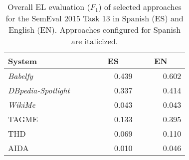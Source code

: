 \documentclass[sigconf]{acmart}
\begin{document}
\begin{table}[tb!]
\centering
\caption{Overall EL evaluation ($F_1$) of selected approaches for the SemEval 2015 Task 13 in Spanish (ES) and English (EN). Approaches configured for Spanish are italicized.}
\label{tab:evaluateEL}
\begin{tabular}{lrr}
\toprule
\textbf{System} &~~~\textbf{ES}~~~&~~~\textbf{EN}~~~ \\ \midrule
\textit{Babelfy}          &0.439&0.602\\
\textit{DBpedia-Spotlight}~~~~&0.337&0.414\\
\textit{WikiMe}           &0.043&0.043\\ \midrule
TAGME                     &0.133&0.395\\
THD                       &0.069&0.110\\
AIDA                      &0.010&0.046\\
\bottomrule
\end{tabular}
\end{table}
\end{document}

